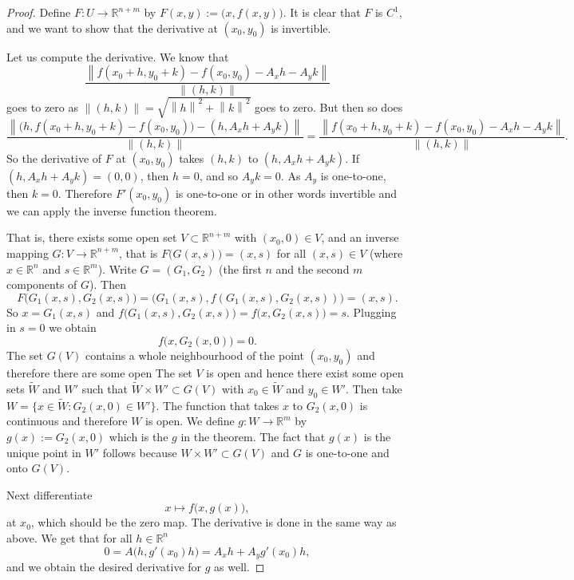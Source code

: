 \documentclass[12pt]{book}
\newcommand{\norm}[1]{\left\lVert {#1} \right\rVert}
\newcommand{\R}{{\mathbb{R}}}
\theoremstyle{plain}
\theoremstyle{remark}
\theoremstyle{definition}
\theoremstyle{exercise}
\theoremstyle{example}
\begin{document}
\begin{proof}
Define $F \colon U \to \R^{n+m}$ by $F(x,y) := \bigl(x,f(x,y)\bigr)$.
It is clear that $F$ is $C^1$, and we want to show that the derivative
at $(x_0,y_0)$ is invertible.

Let us compute the derivative.  We know that
\begin{equation*}
\frac{\norm{f(x_0+h,y_0+k) - f(x_0,y_0) - A_x h - A_y k}}{\norm{(h,k)}}
\end{equation*}
goes to zero as $\norm{(h,k)} = \sqrt{\norm{h}^2+\norm{k}^2}$ goes to zero.
But then so does
\begin{equation*}
\frac{\norm{\bigl(h,f(x_0+h,y_0+k)-f(x_0,y_0)\bigr) - (h,A_x h+A_y
k)}}{\norm{(h,k)}}
=
\frac{\norm{f(x_0+h,y_0+k) - f(x_0,y_0) - A_x h - A_y k}}{\norm{(h,k)}} .
\end{equation*}
So the derivative of $F$ at $(x_0,y_0)$ takes $(h,k)$ to $(h,A_x h+A_y k)$.  If 
$(h,A_x h+A_y k) = (0,0)$, then $h=0$, and so $A_y k = 0$.  As $A_y$ is
one-to-one, then $k=0$.  Therefore $F'(x_0,y_0)$ is one-to-one or in other
words invertible and we can apply the inverse function theorem.

That is, there exists some open set $V \subset \R^{n+m}$ with $(x_0,0) \in V$, and an inverse
mapping $G \colon V \to \R^{n+m}$, that is $F\bigl(G(x,s)\bigr) = (x,s)$ for
all $(x,s) \in V$ (where
$x \in \R^n$ and $s \in \R^m$).
Write $G = (G_1,G_2)$ (the first $n$ and the second $m$ components of $G$).
Then
\begin{equation*}
F\bigl(G_1(x,s),G_2(x,s)\bigr) = \bigl(G_1(x,s),f(G_1(x,s),G_2(x,s))\bigr)
= (x,s) .
\end{equation*}
So $x = G_1(x,s)$ and $f\bigl(G_1(x,s),G_2(x,s)) = f\bigl(x,G_2(x,s)\bigr) = s$.
Plugging in $s=0$ we obtain
\begin{equation*}
f\bigl(x,G_2(x,0)\bigr) = 0 .
\end{equation*}
The set $G(V)$ contains a whole neighbourhood of the point $(x_0,y_0)$
and therefore there are some open
The set $V$ is open and hence there exist some open sets
$\tilde{W}$ and $W'$ such that $\tilde{W} \times W' \subset G(V)$ with $x_0
\in \tilde{W}$ and
$y_0 \in W'$.
Then take $W = \{ x \in \tilde{W} : G_2(x,0) \in W' \}$.
The function that takes $x$ to $G_2(x,0)$ is continuous and therefore $W$
is open.
We define
$g \colon W \to \R^m$ by $g(x) := G_2(x,0)$ which is the $g$ in the theorem.
The fact that $g(x)$ is the unique point in $W'$ follows because $W \times
W' \subset G(V)$ and $G$ is one-to-one and onto $G(V)$.

Next differentiate
\begin{equation*}
x\mapsto f\bigl(x,g(x)\bigr) ,
\end{equation*}
at $x_0$,
which should be the zero map.  The derivative is done in the same way as
above.  We get that for all $h \in \R^{n}$
\begin{equation*}
0 = A\bigl(h,g'(x_0)h\bigr) = A_xh + A_yg'(x_0)h ,
\end{equation*}
and we obtain the desired derivative for $g$ as well.
\end{proof}
\end{document}
